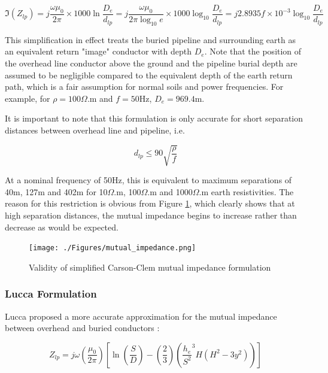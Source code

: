\documentclass{article}
\begin{document}
\begin{equation}
\Im (Z_{lp}) = j \frac{\omega \mu_0}{2 \pi} \times 1000 \ln \frac{D_{e}}{d_{lp}} = j \frac{\omega \mu_0}{2 \pi \log_{10}{e}} \times 1000 \log_{10} \frac{D_{e}}{d_{lp}} = j 2.8935 f \times 10^{-3} \log_{10}{\frac{D_{e}}{d_{lp}}} 
\end{equation}

This simplification in effect treats the buried pipeline and surrounding earth as an equivalent return "image" conductor with depth $D_{e}$. Note that the position of the overhead line conductor above the ground and the pipeline burial depth are assumed to be negligible compared to the equivalent depth of the earth return path, which is a fair assumption for normal soils and power frequencies. For example, for $\rho = 100 \Omega$.m and $f = 50$Hz, $D_e = 969.4$m. 

It is important to note that this formulation is only accurate for short separation distances between overhead line and pipeline, i.e.

\begin{equation}
d_{lp} \leq 90 \sqrt{\frac{\rho}{f}}
\end{equation}

At a nominal frequency of 50Hz, this is equivalent to maximum separations of 40m, 127m and 402m for 10$\Omega$.m, 100$\Omega$.m and 1000$\Omega$.m earth resistivities. The reason for this restriction is obvious from Figure \ref{fig:mutual_impedance}, which clearly shows that at high separation distances, the mutual impedance begins to increase rather than decrease as would be expected.

\begin{figure}
\begin{center}
\caption{Validity of simplified Carson-Clem mutual impedance formulation}
\label{fig:mutual_impedance}
\texttt{[image: ./Figures/mutual\_impedance.png]}
\end{center}
\end{figure}

\subsubsection{Lucca Formulation}
Lucca proposed a more accurate approximation for the mutual impedance between overhead and buried conductors \cite{lucca_1994}:

\begin{equation}
Z_{lp} = j \omega \left( \frac{\mu_{0}}{2 \pi} \right) \left[ \ln \left( \frac{S}{D} \right) - \left( \frac{2}{3} \right) \left( \frac{h_{e}}{S^{2}}^{3} H (H^{2} - 3y^{2}) \right) \right]
\end{equation}
\end{document}
